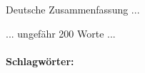 \vspace{0.5cm}

Deutsche Zusammenfassung ...

... ungefähr 200 Worte ...

\paragraph{Schlagwörter:}
